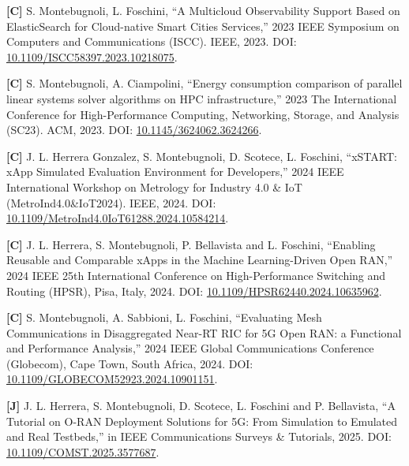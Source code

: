 \documentclass[a4paper,11pt]{article}
\begin{document}
\small{
\begin{enumerate}[label={[\arabic*]}]

    \item \textbf{[C]} S. Montebugnoli, L. Foschini, ``A Multicloud Observability Support Based on ElasticSearch for Cloud-native Smart Cities Services,'' 2023 IEEE Symposium on Computers and Communications (ISCC). IEEE, 2023. DOI: \href{https://doi.org/10.1109/ISCC58397.2023.10218075}{10.1109/ISCC58397.2023.10218075}.

    \item \textbf{[C]} S. Montebugnoli, A. Ciampolini, ``Energy consumption comparison of parallel linear systems solver algorithms on HPC infrastructure,'' 2023 The International Conference for High-Performance Computing, Networking, Storage, and Analysis (SC23). ACM, 2023. DOI: \href{https://doi.org/10.1145/3624062.3624266}{10.1145/3624062.3624266}.

    \item \textbf{[C]} J. L. Herrera Gonzalez, S. Montebugnoli, D. Scotece, L. Foschini, ``xSTART: xApp Simulated Evaluation Environment for Developers,'' 2024 IEEE International Workshop on Metrology for Industry 4.0 \& IoT (MetroInd4.0\&IoT2024). IEEE, 2024. DOI: \href{https://doi.org/10.1109/MetroInd4.0IoT61288.2024.10584214}{10.1109/MetroInd4.0IoT61288.2024.10584214}.

    \item \textbf{[C]} J. L. Herrera, S. Montebugnoli, P. Bellavista and L. Foschini, ``Enabling Reusable and Comparable xApps in the Machine Learning-Driven Open RAN,'' 2024 IEEE 25th International Conference on High-Performance Switching and Routing (HPSR), Pisa, Italy, 2024. DOI: \href{https://doi.org/10.1109/HPSR62440.2024.10635962}{10.1109/HPSR62440.2024.10635962}.

    \item \textbf{[C]} S. Montebugnoli, A. Sabbioni, L. Foschini, ``Evaluating Mesh Communications in Disaggregated Near-RT RIC for 5G Open RAN: a Functional and Performance Analysis,'' 2024 IEEE Global Communications Conference (Globecom), Cape Town, South Africa, 2024. DOI: \href{https://doi.org/10.1109/GLOBECOM52923.2024.10901151}{10.1109/GLOBECOM52923.2024.10901151}.

    \item \textbf{[J]} J. L. Herrera, S. Montebugnoli, D. Scotece, L. Foschini and P. Bellavista, ``A Tutorial on O-RAN Deployment Solutions for 5G: From Simulation to Emulated and Real Testbeds,'' in IEEE Communications Surveys \& Tutorials, 2025. DOI: \href{https://doi.org/10.1109/COMST.2025.3577687}{10.1109/COMST.2025.3577687}.


\end{enumerate}}
\end{document}
